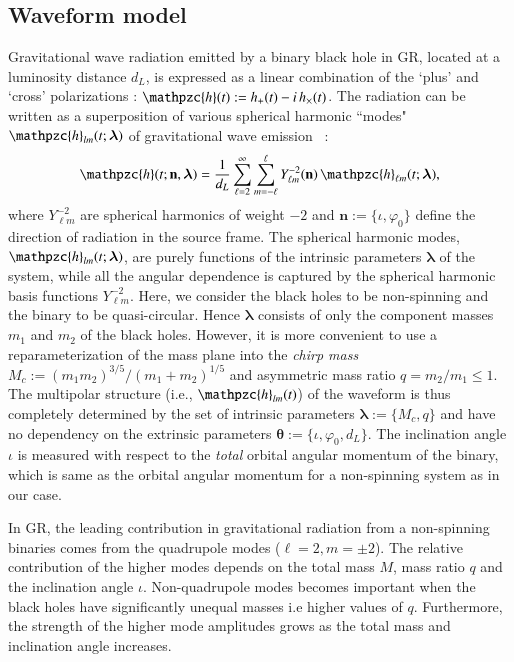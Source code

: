 \documentclass[prd,preprintnumbers,twocolumn,eqsecnum,floatfix,a4paper,nofootinbib,superscriptaddress]{revtex4}
\newcommand{\h}{\mathpzc{h}}
\newcommand{\hlm}{\mathpzc{h}_{\ell m}}
\newcommand{\Ylm}{{Y}^{-2}_{\ell m}}
\newcommand{\blambda}{\bm{\lambda}}
\newcommand{\btheta}{\bm{\theta}}
\newcommand{\n}{\mathbf{n}}
\begin{document}
\subsection{Waveform model}
Gravitational wave radiation emitted by a binary black hole in GR, located at a luminosity distance $d_L$,  is expressed as a linear combination of the `plus' and `cross' polarizations : $\h(t) := h_+(t) - i \, h_\times(t)$. The radiation can be written as a superposition of various spherical harmonic ``modes" ${\h}_{lm}(t; \blambda)$ of gravitational wave emission ~\cite{NewmanPenrose}:
\begin{equation} 
\h(t; \n, \blambda)= \frac{1}{d_L} \sum _{\ell=2}^{\infty} \sum _{m=-\ell}^{\ell} {\Ylm} (\n) \, {{\hlm}(t; {\blambda})}, 
\label{eq:spherical_harmonics}
\end{equation}
where ${\Ylm}$ are spherical harmonics of weight $-2$ and $\n := \{\iota, \varphi_0\}$ define the direction of radiation in the source frame. The spherical harmonic modes, ${\h}_{lm}(t; \blambda)$, are purely functions of the intrinsic parameters $\blambda$ of the system, while all the angular dependence is captured by the spherical harmonic basis functions ${\Ylm}$. Here, we consider the black holes to be non-spinning and the binary to be quasi-circular. Hence $\blambda$ consists of only the component masses $m_1$ and $m_2$ of the black holes. However, it is more convenient to use a reparameterization of the mass plane into the \emph{chirp mass} $M_c := {(m_1m_2)^{3/5}}/{(m_1+m_2)^{1/5}}$ and asymmetric mass ratio $q = m_2/m_1 \leq 1$. The multipolar structure (i.e., ${\h}_{lm}(t)$) of the waveform  is thus completely determined by the set of intrinsic parameters $\blambda := \{M_c, q\}$ and have no dependency on the extrinsic parameters $\btheta := \{\iota, \varphi_0, d_L\}$. The inclination angle $\iota$ is measured with respect to the \textit{total} orbital angular momentum of the binary, which is same as the orbital angular momentum for a non-spinning system as in our case.

 In GR, the leading contribution in gravitational radiation from a non-spinning binaries comes from the quadrupole modes ($\ell = 2, m = \pm 2$). The relative contribution of the higher modes depends on the total mass $M$, mass ratio $q$ and the inclination angle $\iota$.  Non-quadrupole modes becomes important when the black holes have  significantly unequal masses i.e higher values of $q$. Furthermore, the strength of the higher mode amplitudes grows as the total mass and inclination angle increases. 
\end{document}
